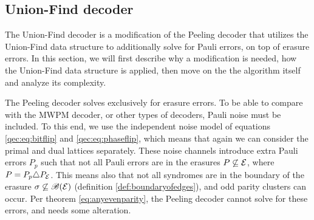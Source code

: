 

\subsection{Union-Find decoder}
The Union-Find decoder \cite{delfosse2017almost} is a modification of the Peeling decoder that utilizes the Union-Find data structure \cite{tarjan1975efficiency} to additionally solve for Pauli errors, on top of erasure errors. In this section, we will first describe why a modification is needed, how the Union-Find data structure is applied, then move on the the algorithm itself and analyze its complexity. 

The Peeling decoder solves exclusively for erasure errors. To be able to compare with the MWPM decoder, or other types of decoders, Pauli noise must be included. To this end, we use the independent noise model of equations \ref{qec:eq:bitflip} and \ref{qec:eq:phaseflip}, which means that again we can consider the primal and dual lattices separately. These noise channels introduce extra Pauli errors $P_p$ such that not all Pauli errors are in the erasures $P\not\subseteq \mathcal{E}$, where $P = P_p\triangle P_{\mathcal{E}}$. This means also that not all syndromes are in the boundary of the erasure $\sigma \not\subseteq \mathscr{B}(\mathcal{E})$ (definition \ref{def:boundaryofedges}), and odd parity clusters can occur. Per theorem \ref{eq:anyevenparity}, the Peeling decoder cannot solve for these errors, and needs some alteration.

